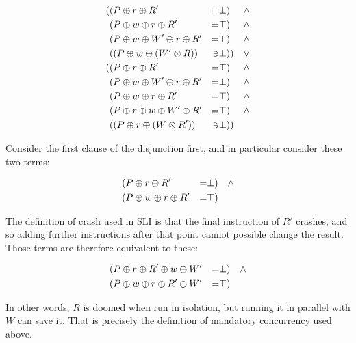 \begin{align*}
( & (P \oplus r \oplus R' & = & \bot) & \wedge \\
  & (P \oplus w \oplus r \oplus R' & = & \top) & \wedge \\
  & (P \oplus w \oplus W' \oplus r \oplus R' & = & \top) & \wedge \\
  & ((P \oplus w \oplus (W' \otimes R)) & \ni & \bot)) & \vee \\
( & (P \oplus r \oplus R' & = & \top) & \wedge \\
  & (P \oplus w \oplus W' \oplus r \oplus R' & = & \bot) & \wedge \\
  & (P \oplus w \oplus r \oplus R' & = & \top) & \wedge \\
  & (P \oplus r \oplus w \oplus W' \oplus R' & = & \top) & \wedge \\
  & ((P \oplus r \oplus (W \otimes R')) & \ni & \bot))
\end{align*}

Consider the first clause of the disjunction first, and in particular consider these two terms:

\begin{align*}
 & (P \oplus r \oplus R' & = & \bot) & \wedge \\
 & (P \oplus w \oplus r \oplus R' & = & \top)
\end{align*}

The definition of crash used in SLI is that the final instruction of $R'$ crashes, and so adding further instructions after that point cannot possible change the result.
Those terms are therefore equivalent to these:

\begin{align*}
 & (P \oplus r \oplus R' \oplus w \oplus W' & = & \bot) & \wedge \\
 & (P \oplus w \oplus r \oplus R' \oplus W' & = & \top)
\end{align*}

In other words, $R$ is doomed when run in isolation, but running it in parallel with $W$ can save it.
That is precisely the definition of mandatory concurrency used above.

